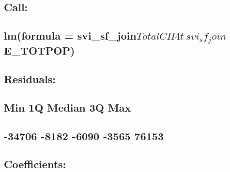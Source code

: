 \documentclass[
  12pt,
]{article}
\begin{document}
\begin{verbatim}
\end{verbatim}

\hypertarget{section-4}{%
\subsection{}\label{section-4}}

\hypertarget{call}{%
\subsection{Call:}\label{call}}

\hypertarget{lmformula-svi_sf_jointotalch4t-svi_sf_joine_totpop}{%
\subsection{\texorpdfstring{lm(formula =
svi\_sf\_join\(TotalCH4t ~ svi_sf_join\)E\_TOTPOP)}{lm(formula = svi\_sf\_joinTotalCH4t \textasciitilde{} svi\_sf\_joinE\_TOTPOP)}}\label{lmformula-svi_sf_jointotalch4t-svi_sf_joine_totpop}}

\hypertarget{section-5}{%
\subsection{}\label{section-5}}

\hypertarget{residuals}{%
\subsection{Residuals:}\label{residuals}}

\hypertarget{min-1q-median-3q-max}{%
\subsection{Min 1Q Median 3Q Max}\label{min-1q-median-3q-max}}

\hypertarget{section-6}{%
\subsection{-34706 -8182 -6090 -3565 76153}\label{section-6}}

\hypertarget{section-7}{%
\subsection{}\label{section-7}}

\hypertarget{coefficients}{%
\subsection{Coefficients:}\label{coefficients}}
\end{document}
